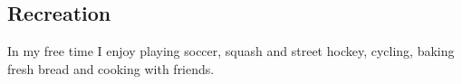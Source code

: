 \documentclass[margin,line]{resume}
\newcommand{\CVsection}[1]{\section{\mysidestyle #1}}
\begin{document}
\begin{resume}
\CVsection{Recreation}

In my free time I enjoy playing soccer, squash and street hockey, cycling, baking fresh bread and cooking with friends.


%
%





\end{resume}
\end{document}
